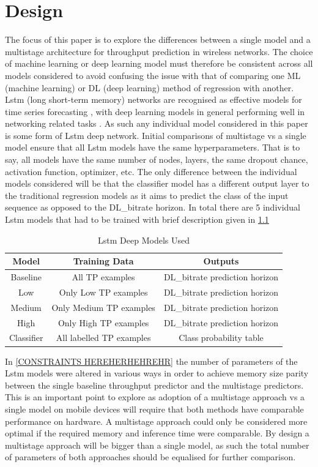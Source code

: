 \chapter{Design}
The focus of this paper is to explore the differences between a single model and a multistage architecture for throughput prediction in wireless networks. The choice of machine learning or deep learning model must therefore be consistent across all models considered to avoid confusing the issue with that of comparing one ML (machine learning) or DL (deep learning) method of regression with another. Lstm (long short-term memory) networks are recognised as effective models for time series forecasting \cite{8614252}, with deep learning models in general performing well in networking related tasks \cite{8666641}. As such any individual model considered in this paper is some form of Lstm deep network. Initial comparisons of multistage vs a single model ensure that all Lstm models have the same hyperparameters. That is to say, all models have the same number of nodes, layers, the same dropout chance, activation function, optimizer, etc. The only difference between the individual models considered will be that the classifier model has a different output layer to the traditional regression models as it aims to predict the class of the input sequence as opposed to the DL\_bitrate horizon. In total there are 5 individual Lstm models that had to be trained with brief description given in \ref{tab:brief_models}

\begin{table}[!htb]
  \centering
  \caption{Lstm Deep Models Used}
  \begin{tabular}{|c|c|c|}
  \hline
    {Model} & {Training Data} & {Outputs} \\
    \hline
	Baseline & All TP examples & DL\_bitrate prediction horizon \\
	\hline
	Low & Only Low TP examples & DL\_bitrate prediction horizon \\
	\hline
	Medium & Only Medium TP examples & DL\_bitrate prediction horizon \\
	\hline
	High & Only High TP examples & DL\_bitrate prediction horizon \\
	\hline
	Classifier & All labelled TP examples & Class probability table \\
  \hline
  \end{tabular}
  \label{tab:brief_models}
\end{table}


In \ref{CONSTRAINTS HEREHERHEHREHR} the number of parameters of the Lstm models were altered in various ways in order to achieve memory size parity between the single baseline throughput predictor and the multistage predictors. This is an important point to explore as adoption of a multistage approach vs a single model on mobile devices will require that both methods have comparable performance on hardware. A multistage approach could only be considered more optimal if the required memory and inference time were comparable. By design a multistage approach will be bigger than a single model, as such the total number of parameters of both approaches should be equalised for further comparison.

